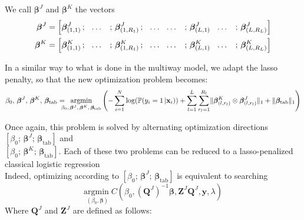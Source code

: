 \documentclass[preprint,12pt]{elsarticle}
\begin{document}
We call $\bm{\beta}^J$ and $\bm{\beta}^K$ the vectors
\begin{align}
    \bm{\beta}^J & = \left[ \bm{\beta}_{(1,1)}^J\, ; \hspace{7 pt} \hdots \hspace{7 pt} \, ; \, \bm{\beta}_{(1,R_1)}^J \,;    \hspace{7 pt} \hdots \hspace{7 pt}  \hdots \hspace{7 pt} \, ; \,  \bm{\beta}_{(L,1)}^J   \hspace{7 pt} \hdots \hspace{7 pt}  \, ;\,\bm{\beta}_{(L,R_L)}^J   \right] \\
    \bm{\beta}^K & = \left[ \bm{\beta}_{(1,1)}^K\, ; \hspace{7 pt} \hdots \hspace{7 pt} \, ; \, \bm{\beta}_{(1,R_1)}^K \,;    \hspace{7 pt} \hdots \hspace{7 pt}  \hdots \hspace{7 pt} \, ; \,  \bm{\beta}_{(L,1)}^K   \hspace{7 pt} \hdots \hspace{7 pt}  \, ;\,\bm{\beta}_{(L,R_L)}^K   \right]
\end{align}

\noindent In a similar way to what is done in the multiway model, we adapt the lasso penalty, so that the new optimization problem becomes:
\begin{equation}
    \beta_0 ,\, \bm{\beta}^J, \, \bm{\beta}^K, \, \bm{\beta}_{\text{tab}} = \hspace{- 8 pt} \underset{\beta_0 ,\, \bm{\beta}^J, \, \bm{\beta}^K, \, \bm{\beta}_{\text{tab}}}{\text{argmin}} \left(  - \sum\limits_{i = 1}^{N} \log(\mathbb{P}(y_i = 1 \, | \mathbf{x}_i)) + \sum\limits_{l = 1}^L \sum\limits_{r_l = 1}^{R_l}
    \lVert \bm{\beta}_{(l,r_l)}^K \otimes \bm{\beta}_{(l,r_l)}^J \rVert_1 + \lVert \bm{\beta}_{\text{tab}} \rVert_1 \right)
\end{equation}

\noindent Once again, this problem is solved by alternating optimization directions $\left[ \beta_0 ;\, \bm{\beta}^J ;\,  \bm{\beta}_{\text{tab}} \right]$ and\\
$\left[ \beta_0 ;\, \bm{\beta}^K ;\,  \bm{\beta}_{\text{tab}} \right]$. Each of these two problems can be reduced to a lasso-penalized classical logistic regression\\[3 pt]
Indeed, optimizing according to $\left[ \beta_0 ;\, \bm{\beta}^J ;\,  \bm{\beta}_{\text{tab}} \right]$ is equivalent to searching
\begin{equation}
    \underset{(\beta_0, \bm{\beta}) }{\text{argmin} \;}  C(\beta_0, (\mathbf{Q}^J)^{-1}\bm{\beta},\mathbf{Z}^J \mathbf{Q}^J, \mathbf{y}, \lambda)
\end{equation}
Where $\mathbf{Q}^J$ and $\mathbf{Z}^J$ are defined as follows:
\end{document}
